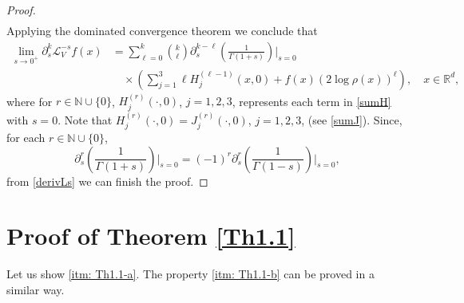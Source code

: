 \documentclass[10pt, a4paper, reqno]{amsart}
\theoremstyle{definition}
\theoremstyle{remark}
\numberwithin{equation}{section}
\begin{document}
\begin{proof}
\begin{align*}
\end{align*}
Applying the dominated convergence theorem we conclude that
\begin{align*}
\lim_{s\rightarrow 0^+}\partial_s^k\mathcal L_V^{-s}f(x)&=\sum_{\ell =0}^k\binom{k}{\ell}\partial _s^{k-\ell}\left(\frac{1}{\Gamma (1+s)}\right)\Big|_{s=0}\\
&\quad \times \left(\sum_{j=1}^3\ell H_j^{(\ell -1)}(x,0)+f(x)(2\log \rho (x))^\ell \right),\quad x\in \mathbb R^d,
\end{align*}
where for $r\in \mathbb N\cup\{0\}$, $H_j^{(r)}(\cdot, 0)$, $j=1,2,3$, represents each term in \eqref{sumH} with $s=0$. Note that $H_j^{(r)}(\cdot, 0)=J_j^{(r)}(\cdot, 0)$, $j=1,2,3$, (see \eqref{sumJ}). Since, for each $r\in \mathbb N\cup\{0\}$, 
\[
\partial_s^r\left(\frac{1}{\Gamma (1+s)}\right)\Big|_{s=0}=(-1)^r\partial _s^r\left(\frac{1}{\Gamma (1-s)}\right)\Big|_{s=0},
\]
from \eqref{derivLs} we can finish the proof.
\end{proof}

\section{Proof of Theorem \ref{Th1.1}}
Let us show \ref{itm: Th1.1-a}. The property \ref{itm: Th1.1-b} can be proved in a similar way.
\end{document}
